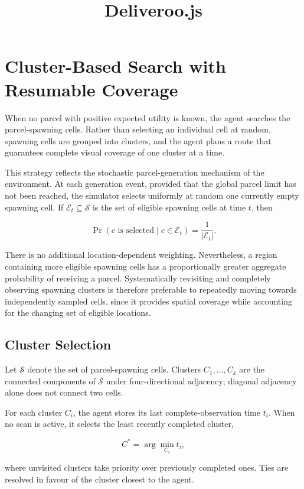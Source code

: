 \documentclass[a4paper]{article}
\title{Deliveroo.js}
\begin{document}
\maketitle

\section{Cluster-Based Search with Resumable Coverage}
\label{subsec:cluster-search}

When no parcel with positive expected utility is known, the agent searches the
parcel-spawning cells. Rather than selecting an individual cell at random,
spawning cells are grouped into clusters, and the agent plans a route that
guarantees complete visual coverage of one cluster at a time.

This strategy reflects the stochastic parcel-generation mechanism of the
environment. At each generation event, provided that the global parcel limit
has not been reached, the simulator selects uniformly at random one currently
empty spawning cell. If $\mathcal{E}_t\subseteq\mathcal{S}$ is the set of
eligible spawning cells at time $t$, then

\[
    \Pr(c\text{ is selected}\mid c\in\mathcal{E}_t)
    = \frac{1}{|\mathcal{E}_t|}.
\]

There is no additional location-dependent weighting. Nevertheless, a region
containing more eligible spawning cells has a proportionally greater aggregate
probability of receiving a parcel. Systematically revisiting and completely
observing spawning clusters is therefore preferable to repeatedly moving
towards independently sampled cells, since it provides spatial coverage while
accounting for the changing set of eligible locations.

\subsection{Cluster Selection}

Let $\mathcal{S}$ denote the set of parcel-spawning cells. Clusters
$C_1,\ldots,C_k$ are the connected components of $\mathcal{S}$ under
four-directional adjacency; diagonal adjacency alone does not connect two
cells.

For each cluster $C_i$, the agent stores its last complete-observation time
$t_i$. When no scan is active, it selects the least recently completed cluster,

\[
    C^* = \arg\min_{C_i} t_i,
\]

where unvisited clusters take priority over previously completed ones. Ties
are resolved in favour of the cluster closest to the agent.
\end{document}
